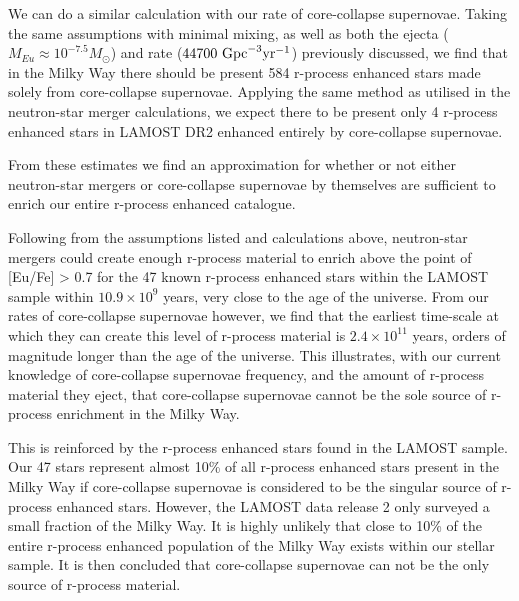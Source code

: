 \documentclass[a4paper,fleqn,usenatbib]{mnras}
\begin{document}
    We can do a similar calculation with our rate of core-collapse supernovae. Taking the same assumptions with minimal mixing, as well as both the ejecta ($M_{Eu}\approx10^{-7.5} M_{\odot}$) and rate ($44700\ \rm{Gpc}^{-3} \rm{yr^{-1}}$) previously discussed, we find that in the Milky Way there should be present 584 r-process enhanced stars made solely from core-collapse supernovae. Applying the same method as utilised in the neutron-star merger calculations, we expect there to be present only 4 r-process enhanced stars in LAMOST DR2 enhanced entirely by core-collapse supernovae.
    
    
    From these estimates we find an approximation for whether or not either neutron-star mergers or core-collapse supernovae by themselves are sufficient to enrich our entire r-process enhanced catalogue. 
    
    Following from the assumptions listed and calculations above, neutron-star mergers could create enough r-process material to enrich above the point of [Eu/Fe] > 0.7 for the 47 known r-process enhanced stars within the LAMOST sample within $10.9\times10^{9}$ years, very close to the age of the universe. From our rates of core-collapse supernovae however, we find that the earliest time-scale at which they can create this level of r-process material is $2.4\times10^{11}$ years, orders of magnitude longer than the age of the universe. This illustrates, with our current knowledge of core-collapse supernovae frequency, and the amount of r-process material they eject, that core-collapse supernovae cannot be the sole source of r-process enrichment in the Milky Way.
    
    This is reinforced by the r-process enhanced stars found in the LAMOST sample. Our 47 stars represent almost 10\% of all r-process enhanced stars present in the Milky Way if core-collapse supernovae is considered to be the singular source of r-process enhanced stars. However, the LAMOST data release 2 only surveyed a small fraction of the Milky Way. It is highly unlikely that close to 10\% of the entire r-process enhanced population of the Milky Way exists within our stellar sample. It is then concluded that core-collapse supernovae can not be the only source of r-process material. 
    
\end{document}
